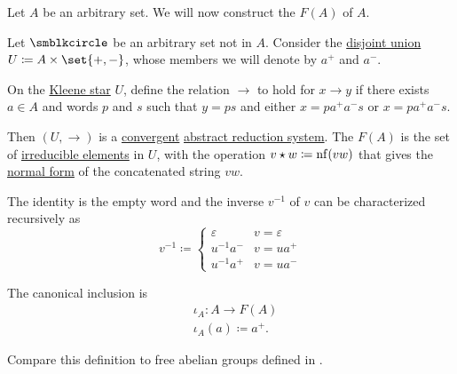 \begin{definition}\label{def:free_group}
  Let \( A \) be an arbitrary set. We will now construct the  \( F(A) \) of \( A \).

  Let \( \anon \) be an arbitrary set not in \( A \). Consider the \hyperref[def:disjoint_union]{disjoint union} \( U \coloneqq A \times \set{ +, - } \), whose members we will denote by \( a^+ \) and \( a^- \).

  On the \hyperref[def:formal_language/kleene_star]{Kleene star} \( U \), define the relation \( \to \) to hold for \( x \to y \) if there exists \( a \in A \) and words \( p \) and \( s \) such that \( y = ps \) and either \( x = p a^+ a^- s \) or \( x = p a^+ a^- s \).

  Then \( (U, \to) \) is a \hyperref[def:abstract_rewriting_convergence/convergent]{convergent} \hyperref[def:abstract_reduction_system]{abstract reduction system}. The  \( F(A) \) is the set of \hyperref[def:abstract_reduction_system/hierarchy]{irreducible elements} in \( U \), with the operation \( v \star w \coloneqq \operatorname{nf}(vw) \) that gives the \hyperref[def:abstract_reduction_system/normal_form]{normal form} of the concatenated string \( vw \).

  The identity is the empty word and the inverse \( v^{-1} \) of \( v \) can be characterized recursively as
  \begin{equation*}
    v^{-1} \coloneqq \begin{cases}
      \varepsilon &v = \varepsilon \\
      u^{-1} a^-  &v = u a^+ \\
      u^{-1} a^+  &v = u a^-
    \end{cases}
  \end{equation*}

  The canonical inclusion is
  \begin{equation*}
    \begin{aligned}
      &\iota_A: A \to F(A) \\
      &\iota_A(a) \coloneqq a^+.
    \end{aligned}
  \end{equation*}

  Compare this definition to free abelian groups defined in .
\end{definition}
